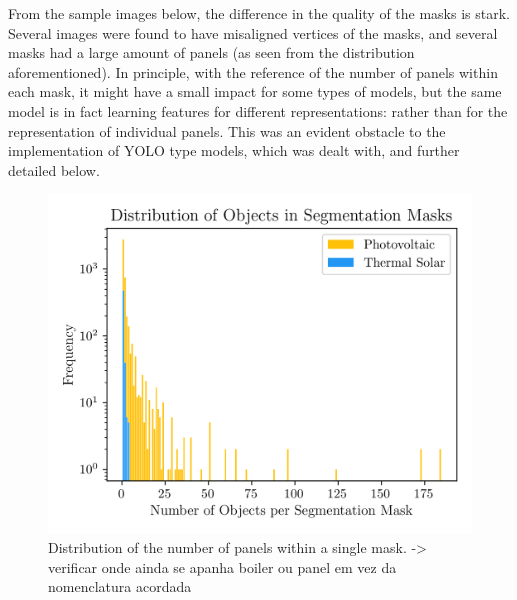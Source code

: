 \documentclass[conference]{IEEEtran}
\begin{document}
From the sample images below, the difference in the quality of the masks is stark. Several images were found to have misaligned vertices of the masks, and several masks had a large amount of panels (as seen from the distribution aforementioned). In principle, with the reference of the number of panels within each mask, it might have a small impact for some types of models, but the same model is in fact learning features for different representations: rather than for the representation of individual panels. This was an evident obstacle to the implementation of YOLO type models, which was dealt with, and further detailed below.
\begin{figure}[H]
    \centering
    \includegraphics[width=1\linewidth]{assets/data_objectdistribution.png}
    \caption{Distribution of the number of panels within a single mask. -> verificar onde ainda se apanha boiler ou panel em vez da nomenclatura acordada}
    \label{fig:data_objectdistribution}
\end{figure}

%
%
\end{document}
